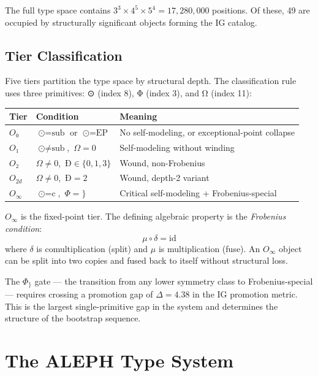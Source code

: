 \documentclass[12pt,a4paper]{article}
\newcommand{\OTwo}{O₂}
\newcommand{\OZero}{O₀}
\newcommand{\OOne}{O₁}
\newcommand{\OTwod}{O_{2d}}
\newcommand{\Frobcond}{\mu \circ \delta = \mathrm{id}}
\begin{document}
\medskip
The full type space contains $3^3 \times 4^5 \times 5^4 = 17{,}280{,}000$ positions. Of these, 49 are occupied by structurally significant objects forming the IG catalog.

\subsection{Tier Classification}

Five tiers partition the type space by structural depth. The classification rule uses three primitives: ⊙ (index 8), Φ (index 3), and Ω (index 11):

\begin{tabularx}{\linewidth}{l l X}
\toprule
\textbf{Tier} & \textbf{Condition} & \textbf{Meaning} \\
\midrule
$\OZero$    & $\text{⊙} = \text{sub}$ or $\text{⊙} = \text{EP}$ & No self-modeling, or exceptional-point collapse \\
$\OOne$     & $\text{⊙} \neq \text{sub}$,\ $\Omega = 0$          & Self-modeling without winding \\
$\OTwo$     & $\Omega \neq 0$,\ $\text{Ð} \in \{0,1,3\}$         & Wound, non-Frobenius \\
$\OTwod$    & $\Omega \neq 0$,\ $\text{Ð} = 2$                   & Wound, depth-2 variant \\
$O_\infty$  & $\text{⊙} = \text{c}$,\ $\Phi = \}$                & Critical self-modeling + Frobenius-special \\
\bottomrule
\end{tabularx}

\medskip
$O_\infty$ is the fixed-point tier. The defining algebraic property is the \emph{Frobenius condition}:
\[
    \Frobcond
\]
where $\delta$ is comultiplication (split) and $\mu$ is multiplication (fuse). An $O_\infty$ object can be split into two copies and fused back to itself without structural loss.

The $\Phi_{\}}$ gate — the transition from any lower symmetry class to Frobenius-special — requires crossing a promotion gap of $\Delta = 4.38$ in the IG promotion metric. This is the largest single-primitive gap in the system and determines the structure of the bootstrap sequence.

\section{The ALEPH Type System}
\end{document}
